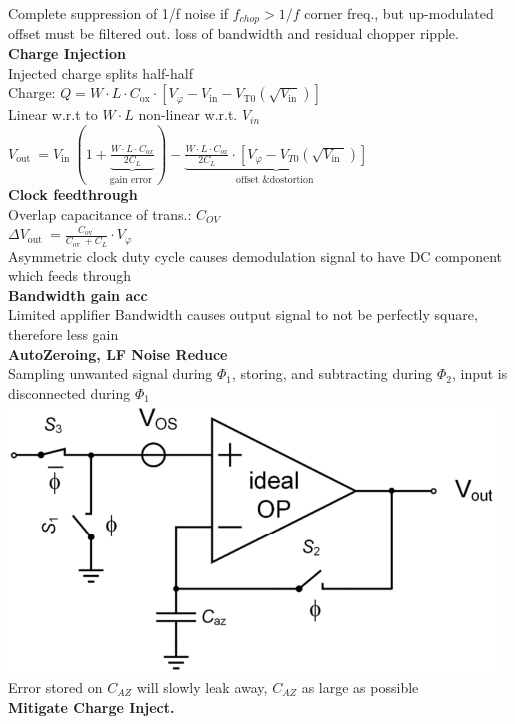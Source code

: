 \documentclass[5pt]{article}
\begin{document}
\begin{multicols*}{4}
Complete suppression of 1/f noise if $ f_{chop} > 1/f $ corner freq., but up-modulated offset must be filtered out. loss of bandwidth and residual chopper ripple.
\textbf{Charge Injection}\\
Injected charge splits half-half\\
Charge: $ Q=W \cdot L \cdot C_{\mathrm{ox}} \cdot\left[V_{\varphi}-V_{\mathrm{in}}-V_{\mathrm{T} 0}\left(\sqrt{V_{\mathrm{in}}}\right)\right] $\\
Linear w.r.t to $ W\cdot L $ non-linear w.r.t. $ V_{in} $
$ V_{\text {out }}=V_{\text {in }}(1+\underbrace{\frac{W \cdot L \cdot C_{o x}}{2 C_{L}}}_{\text {gain error }})-\underbrace{\frac{W \cdot L \cdot C_{o x}}{2 C_{L}} \cdot\left[V_{\varphi}-V_{T 0}\left(\sqrt{V_{\text {in }}}\right)\right]}_{\text {offset \& dostortion }} $\\
\textbf{Clock feedthrough}\\
Overlap capacitance of trans.: $ C_{OV} $\\
$ \Delta V_{\text {out }}=\frac{C_{\text {ov }}}{C_{\text {ov }}+C_{L}} \cdot V_{\varphi} $\\
Asymmetric clock duty cycle causes demodulation signal to have DC component which feeds through\\
\textbf{Bandwidth gain acc}\\
Limited applifier Bandwidth causes output signal to not be perfectly square, therefore less gain\\
\textbf{AutoZeroing, LF Noise Reduce}\\
Sampling unwanted signal during $ \Phi_1 $, storing, and subtracting during $ \Phi_2 $, input is disconnected during $ \Phi_1 $
\includegraphics[width=0.8\columnwidth]{images/auto_zero_analog_imp.png}\\
Error stored on $ C_{AZ} $ will slowly leak away, $ C_{AZ} $ as large as possible\\
\textbf{Mitigate Charge Inject.}\\

\end{multicols*}
\end{document}
